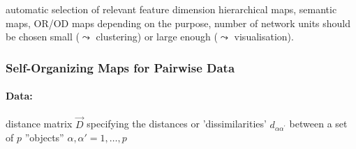 \begin{itemize}
  \itR automatic selection of relevant feature dimension
  \itR hierarchical maps, semantic maps, OR/OD maps 
\itR depending on the purpose, number of network units should be chosen small ($\leadsto$ clustering) or large enough ($\leadsto$ visualisation).  
\end{itemize}



\subsubsection{Self-Organizing Maps for Pairwise Data}
\label{sec:pairwiseSOMs}
\paragraph{Data:} distance matrix $\vec{D}$ specifying the distances or 'dissimilarities' $d_{\alpha \alpha^{'}}$ between a set of $p$ ''objects'' $\alpha, \alpha' = 1, \ldots, p$
